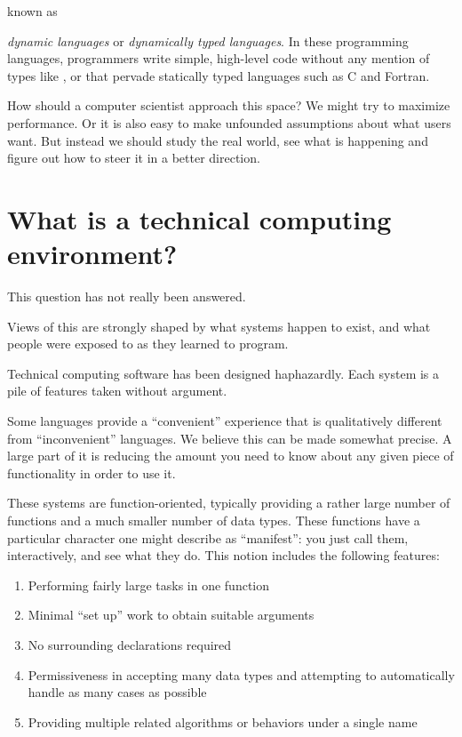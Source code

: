 known as { {\it dynamic languages} or {\it dynamically typed languages}.
In these programming
languages, programmers write simple, high-level code without any
mention of types like ,  or  that
pervade statically typed languages such as C and Fortran.


How should a computer scientist approach this space? We might try to
maximize performance. Or it is also easy to make unfounded assumptions about
what users want. But instead we should study the real world, see
what is happening and figure out how to steer it in a better direction.


\section{What is a technical computing environment?}

This question has not really been answered.

Views of this are strongly shaped by what systems happen to exist,
and what people were exposed to as they learned to program.

Technical computing software has been designed haphazardly. Each system
is a pile of features taken without argument.

Some languages provide a ``convenient'' experience that is
qualitatively different from ``inconvenient'' languages. We believe
this can be made somewhat precise. A large part of it is reducing the
amount you need to know about any given piece of functionality in order
to use it.

These systems are function-oriented, typically providing a rather
large number of functions and a much smaller number of data types.
These functions have a particular
character one might describe as ``manifest'': you just call them,
interactively, and see what they do. This notion includes the
following features:

\vspace{-3ex}
\begin{singlespace}
\begin{enumerate}
\item Performing fairly large tasks in one function
\item Minimal ``set up'' work to obtain suitable arguments
\item No surrounding declarations required
\item Permissiveness in accepting many data types and attempting to
      automatically handle as many cases as possible
\item Providing multiple related algorithms or behaviors under a single name
\end{enumerate}
\end{singlespace}

}

